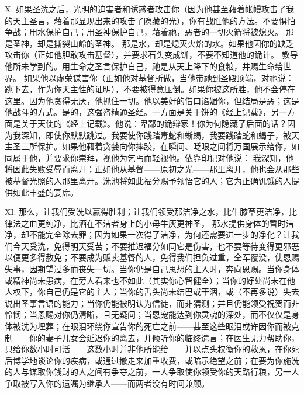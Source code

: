 X. 如果圣洗之后，光明的迫害者和诱惑者攻击你（因为他甚至藉着帐幔攻击了我的天主圣言，藉着那显现出来的攻击了隐藏的光），你有战胜他的方法。不要惧怕争战；用水保护自己；用圣神保护自己，藉着祂，恶者的一切火箭将被熄灭。 那是圣神，却是撕裂山岭的圣神。 那是水，却是熄灭火焰的水。如果他因你的缺乏攻击你（正如他胆敢攻击基督），并要求石头变成饼，不要不知道他的诡计。 教导他所未学到的。用生命之圣言保护自己，祂是从天上降下的食粮，并赐生命给世界。 如果他以虚荣谋害你（正如他对基督所做，当他带祂到圣殿顶端，对祂说：跳下去，作为你天主性的证明），不要被得意压倒。如果你被这所胜，他不会停在这里。因为他贪得无厌，他抓住一切。他以美好的借口谄媚你，但结局是恶；这是他战斗的方式。是的，这强盗精通圣经。一方面是关于饼的《经上记载》，另一方面是关于天使的《经上记载》。他说：卑鄙的诡辩家！你为何隐藏了后面的话？因为我深知，即使你默默跳过。我要使你践踏毒蛇和蜥蜴，我要践踏蛇和蝎子，被天主圣三所保护。如果他藉着贪婪向你摔跤，在瞬间、眨眼之间将万国展示给你，如同属于他，并要求你崇拜，视他为乞丐而轻视他。依靠印记对他说： 我深知，他将因此失败受辱而离开；正如他从基督——原初之光——那里离开，他也会从那些被基督光照的人那里离开。洗池将如此福分赐予领悟它的人；它为正确饥饿的人提供如此丰盛的宴席。\par

XI. 那么，让我们受洗以赢得胜利；让我们领受那洁净之水，比牛膝草更洁净，比律法之血更纯净，比洒在不洁者身上的小母牛灰更神圣， 那水提供身体的暂时洁净，却不能完全除去罪；因为如果一次得了洁净，为何还需要进一步的净化？让我们今天受洗，免得明天受苦；不要推迟福分如同它是伤害，也不要等待变得更邪恶以便更多得赦免；不要成为贩卖基督的人，免得我们担负过重，全军覆没，使恩赐失事，因期望过多而丧失一切。当你仍是自己思想的主人时，奔向恩赐。当你身体或精神尚未患病，在旁人看来也不如此（其实你心智健全）；当你的好处尚未在他人权下，你自己仍是它的主人；当你的舌头尚未结巴或干涸，或（不再多说）失去说出圣事言语的能力；当你仍能被明认为信徒，而非猜测；并且仍能领受祝贺而非怜悯；当恩赐对你仍清晰，且无疑问；当恩宠能达到你灵魂的深处，而不仅仅是身体被洗为埋葬；在眼泪环绕你宣告你的死亡之前——甚至这些眼泪或许因你而被克制——你的妻子儿女会延迟你的离去，并倾听你的临终遗言；在医生无力帮助你，只给你数小时可活——这数小时并非他所能给——并以点头权衡你的救恩，在你死后博学地谈论你的疾病，或通过撤走来加重收费，或暗示绝望之前；在要为你施洗的人与谋取你钱财的人之间有争夺之前，一人争取使你领受你的天路行粮，另一人争取被写入你的遗嘱为继承人——而两者没有时间兼顾。\par

